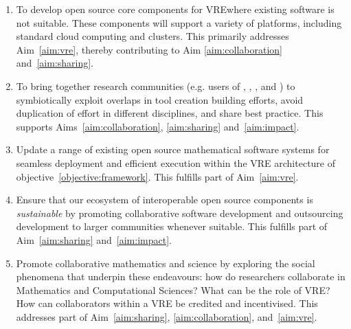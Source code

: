 \documentclass[noworkareas,deliverables,\classoptions]{euproposal}       %
\newcommand{\VREs}{VRE}
\begin{document}
\begin{proposal}
\begin{enumerate}
\item\label{objectives:core} To develop open source core components
  for \VREs where existing software is not suitable. These components
  will support a variety of platforms, including standard cloud
  computing and clusters. This primarily addresses Aim~\ref{aim:vre},
  thereby contributing to Aim \ref{aim:collaboration}
  and~\ref{aim:sharing}.

\item \label{objective:community} To bring together research
  communities (e.g. users of \Jupyter, \Sage, \Singular, and \GAP) to
  symbiotically exploit overlaps in tool creation building efforts,
  avoid duplication of effort in different disciplines, and share best
  practice. This supports Aims~\ref{aim:collaboration},
  \ref{aim:sharing} and~\ref{aim:impact}.

\item \label{objective:updates} Update a range of existing open source
  mathematical software systems for seamless deployment and efficient
  execution within the VRE architecture of objective~\ref{objective:framework}.
  This fulfills part of Aim~\ref{aim:vre}.



\item \label{objective:sustainable} Ensure that our ecosystem of
  interoperable open source components is \emph{sustainable} by
  promoting collaborative software development and outsourcing
  development to larger communities whenever suitable. This fulfills
  part of Aim~\ref{aim:sharing} and~\ref{aim:impact}.

\item \label{objective:social} Promote collaborative mathematics and
  science by exploring the social phenomena that underpin these
  endeavours: how do researchers collaborate in Mathematics and
  Computational Sciences?  What can be the role of \VREs?  How can
  collaborators within a VRE be credited and incentivised. This
  addresses part of Aim~\ref{aim:sharing}, \ref{aim:collaboration},
  and~\ref{aim:vre}.


\end{enumerate}
\end{proposal}
\end{document}
